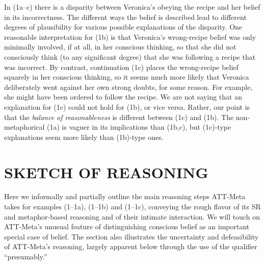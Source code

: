 
In (1a--c) there is a disparity between Veronica's obeying the recipe and her
belief in its incorrectness.  The different ways the belief is described lead
to different degrees of plausibility for various possible explanations of the
disparity.  One reasonable interpretation for (1b) is that Veronica's
wrong-recipe belief was only minimally involved, if at all, in her conscious
thinking, so that she did not consciously think (to any significant degree)
that she was following a recipe that was incorrect.
%
%
By contrast, continuation (1c) places the wrong-recipe belief squarely in her
conscious thinking, so it seems much more likely that Veronica deliberately
went against her own strong doubts, for some reason.  For example, she might
have been ordered to follow the recipe.  We are not saying that an explanation
for (1c) could not hold for (1b), or vice versa.  Rather, our point is that the
{\it balance of reasonableness} is different between (1c) and (1b).  The
non-metaphorical (1a) is vaguer in its implications than (1b,c), but (1c)-type
explanations seem more likely than (1b)-type ones.



\section{SKETCH OF REASONING}%

Here we informally and partially outline the main reasoning steps ATT-Meta
takes for examples (1--1a), (1--1b) and (1--1c), conveying the rough flavor of
its SR and metaphor-based reasoning and of their intimate interaction.  We will
touch on ATT-Meta's unusual feature of distinguishing conscious belief as an
important special case of belief. The section also illustrates the uncertainty
and defeasibility of ATT-Meta's reasoning, largely apparent below through the
use of the qualifier ``presumably.''


